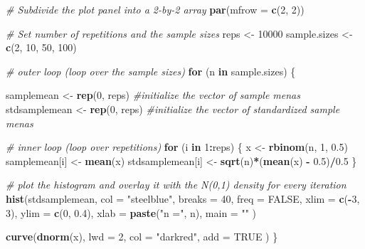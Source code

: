 \documentclass[]{book}
\newenvironment{Shaded}{\begin{snugshade}}{\end{snugshade}}
\newcommand{\KeywordTok}[1]{\textcolor[rgb]{0.13,0.29,0.53}{\textbf{#1}}}
\newcommand{\DataTypeTok}[1]{\textcolor[rgb]{0.13,0.29,0.53}{#1}}
\newcommand{\DecValTok}[1]{\textcolor[rgb]{0.00,0.00,0.81}{#1}}
\newcommand{\FloatTok}[1]{\textcolor[rgb]{0.00,0.00,0.81}{#1}}
\newcommand{\StringTok}[1]{\textcolor[rgb]{0.31,0.60,0.02}{#1}}
\newcommand{\CommentTok}[1]{\textcolor[rgb]{0.56,0.35,0.01}{\textit{#1}}}
\newcommand{\OtherTok}[1]{\textcolor[rgb]{0.56,0.35,0.01}{#1}}
\newcommand{\ControlFlowTok}[1]{\textcolor[rgb]{0.13,0.29,0.53}{\textbf{#1}}}
\newcommand{\OperatorTok}[1]{\textcolor[rgb]{0.81,0.36,0.00}{\textbf{#1}}}
\newcommand{\NormalTok}[1]{#1}
\theoremstyle{definition}
\theoremstyle{definition}
\theoremstyle{definition}
\theoremstyle{remark}
\begin{document}
\begin{Shaded}
\begin{Highlighting}[]
\CommentTok{# Subdivide the plot panel into a 2-by-2 array}
\KeywordTok{par}\NormalTok{(}\DataTypeTok{mfrow =} \KeywordTok{c}\NormalTok{(}\DecValTok{2}\NormalTok{, }\DecValTok{2}\NormalTok{))}

\CommentTok{# Set number of repetitions and the sample sizes}
\NormalTok{reps <-}\StringTok{ }\DecValTok{10000}
\NormalTok{sample.sizes <-}\StringTok{ }\KeywordTok{c}\NormalTok{(}\DecValTok{2}\NormalTok{, }\DecValTok{10}\NormalTok{, }\DecValTok{50}\NormalTok{, }\DecValTok{100}\NormalTok{)}

\CommentTok{# outer loop (loop over the sample sizes)}
  \ControlFlowTok{for}\NormalTok{ (n }\ControlFlowTok{in}\NormalTok{ sample.sizes) \{}
    
\NormalTok{    samplemean <-}\StringTok{ }\KeywordTok{rep}\NormalTok{(}\DecValTok{0}\NormalTok{, reps) }\CommentTok{#initialize the vector of sample menas}
\NormalTok{    stdsamplemean <-}\StringTok{ }\KeywordTok{rep}\NormalTok{(}\DecValTok{0}\NormalTok{, reps) }\CommentTok{#initialize the vector of standardized sample menas}

\CommentTok{# inner loop (loop over repetitions)   }
    \ControlFlowTok{for}\NormalTok{ (i }\ControlFlowTok{in} \DecValTok{1}\OperatorTok{:}\NormalTok{reps) \{}
\NormalTok{      x <-}\StringTok{ }\KeywordTok{rbinom}\NormalTok{(n, }\DecValTok{1}\NormalTok{, }\FloatTok{0.5}\NormalTok{)}
\NormalTok{      samplemean[i] <-}\StringTok{ }\KeywordTok{mean}\NormalTok{(x)}
\NormalTok{      stdsamplemean[i] <-}\StringTok{ }\KeywordTok{sqrt}\NormalTok{(n)}\OperatorTok{*}\NormalTok{(}\KeywordTok{mean}\NormalTok{(x) }\OperatorTok{-}\StringTok{ }\FloatTok{0.5}\NormalTok{)}\OperatorTok{/}\FloatTok{0.5}
\NormalTok{    \}}
    
\CommentTok{# plot the histogram and overlay it with the N(0,1) density for every iteration    }
    \KeywordTok{hist}\NormalTok{(stdsamplemean, }
         \DataTypeTok{col =} \StringTok{"steelblue"}\NormalTok{, }
         \DataTypeTok{breaks =} \DecValTok{40}\NormalTok{, }
         \DataTypeTok{freq =} \OtherTok{FALSE}\NormalTok{, }
         \DataTypeTok{xlim =} \KeywordTok{c}\NormalTok{(}\OperatorTok{-}\DecValTok{3}\NormalTok{, }\DecValTok{3}\NormalTok{), }
         \DataTypeTok{ylim =} \KeywordTok{c}\NormalTok{(}\DecValTok{0}\NormalTok{, }\FloatTok{0.4}\NormalTok{), }
         \DataTypeTok{xlab =} \KeywordTok{paste}\NormalTok{(}\StringTok{"n ="}\NormalTok{, n), }
         \DataTypeTok{main =} \StringTok{""}
\NormalTok{         )}
    
    \KeywordTok{curve}\NormalTok{(}\KeywordTok{dnorm}\NormalTok{(x), }
          \DataTypeTok{lwd =} \DecValTok{2}\NormalTok{, }
          \DataTypeTok{col =} \StringTok{"darkred"}\NormalTok{, }
          \DataTypeTok{add =} \OtherTok{TRUE}
\NormalTok{          )}
\NormalTok{  \}  }
\end{Highlighting}
\end{Shaded}
\end{document}

